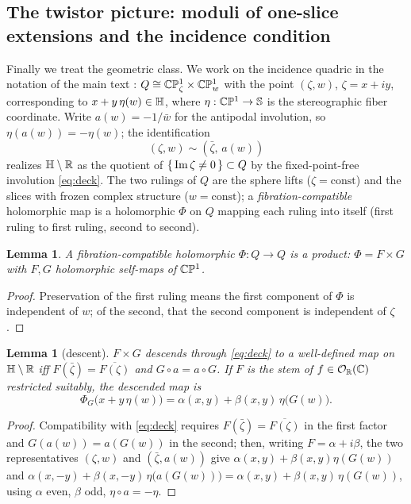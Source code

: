 \documentclass[11pt]{amsart}
\newtheorem{lemma}[theorem]{Lemma}
\theoremstyle{definition}
\theoremstyle{remark}
\begin{document}
\subsection{The twistor picture: moduli of one-slice extensions and the
incidence condition}\label{app:twistor}

Finally we treat the geometric class.  We work on the incidence quadric
in the notation of the main text%
: $Q\cong\mathbb{C}\mathbb{P}^1_\zeta\times\mathbb{C}\mathbb{P}^1_w$ with the point $(\zeta,w)$,
$\zeta=x+iy$, corresponding to $x+y\,\eta(w)\in\mathbb{H}$, where
$\eta:\mathbb{C}\mathbb{P}^1\to\mathbb{S}$ is the stereographic fiber coordinate.  Write
$a(w)=-1/\bar w$ for the antipodal involution, so
$\eta(a(w))=-\eta(w)$; the identification
\begin{equation}\label{eq:deck}
(\zeta,w)\sim(\bar\zeta,\,a(w))
\end{equation}
realizes $\mathbb{H}\setminus\mathbb{R}$ as the quotient of
$\{\,\operatorname{Im}\zeta\neq0\,\}\subset Q$ by the fixed-point-free involution
\eqref{eq:deck}.  The two rulings of $Q$ are the sphere lifts
($\zeta=\mathrm{const}$) and the slices with frozen complex structure
($w=\mathrm{const}$); a \emph{fibration-compatible} holomorphic map is a
holomorphic $\Phi$ on $Q$ mapping each ruling into itself (first ruling
to first ruling, second to second).

\begin{lemma}\label{lem:product}
A fibration-compatible holomorphic $\Phi:Q\to Q$ is a product:
$\Phi=F\times G$ with $F,G$ holomorphic self-maps of $\mathbb{C}\mathbb{P}^1$.
\end{lemma}

\begin{proof}
Preservation of the first ruling means the first component of $\Phi$ is
independent of $w$; of the second, that the second component is
independent of $\zeta$.
\end{proof}

\begin{lemma}[descent]\label{lem:descent}
$F\times G$ descends through \eqref{eq:deck} to a well-defined map on
$\mathbb{H}\setminus\mathbb{R}$ iff $F(\bar\zeta)=\overline{F(\zeta)}$ and
$G\circ a=a\circ G$.  If $F$ is the stem of $f\in\mathcal{O}_{\mathbb{R}}(\mathbb{C})$ restricted
suitably, the descended map is
\begin{equation}\label{eq:twisted}
\Phi_G\bigl(x+y\,\eta(w)\bigr)
=\alpha(x,y)+\beta(x,y)\,\eta\bigl(G(w)\bigr).
\end{equation}
\end{lemma}

\begin{proof}
Compatibility with \eqref{eq:deck} requires
$F(\bar\zeta)=\overline{F(\zeta)}$ in the first factor and
$G(a(w))=a(G(w))$ in the second; then, writing $F=\alpha+i\beta$, the two
representatives $(\zeta,w)$ and $(\bar\zeta,a(w))$ give
$\alpha(x,y)+\beta(x,y)\eta(G(w))$ and
$\alpha(x,-y)+\beta(x,-y)\,\eta\bigl(a(G(w))\bigr)
=\alpha(x,y)+\beta(x,y)\,\eta(G(w))$, using $\alpha$ even, $\beta$ odd,
$\eta\circ a=-\eta$.
\end{proof}
\end{document}
